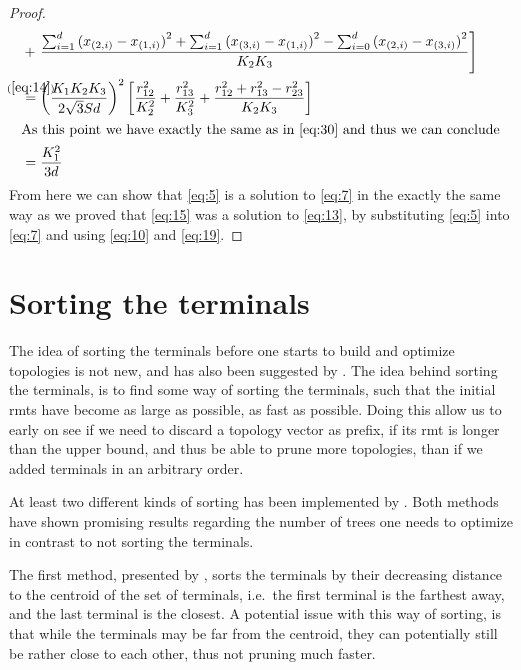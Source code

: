 \begin{proof}
\begin{align}
  &+ \left. \frac{ \sum_{i=1}^d {(x_{(2,i)} - x_{(1,i)})}^2 +
    \sum_{i=1}^d {(x_{(3,i)} - x_{(1,i)})}^2 -
    \sum_{i=0}^d {(x_{(2,i)} - x_{(3,i)})}^2}{K_2 K_3} \right] \\
  &\stackrel{\mathclap{(\ref{eq:14})}}{=}
    {\left( \frac{K_1 K_2 K_3}{2 \sqrt{3} S d} \right)}^2
    \left[ \frac{r_{12}^2}{K_2^2} + \frac{r_{13}^2}{K_3^2} +
    \frac{r_{12}^2 + r_{13}^2 - r_{23}^2}{K_2 K_3} \right] \\
  \intertext{As this point we have exactly the same as in \cref{eq:30} and thus
  we can conclude}
  &= \frac{K_1^2}{3 d}
\end{align}
%
From here we can show that \cref{eq:5} is a solution to \cref{eq:7} in the
exactly the same way as
we proved that \cref{eq:15} was a solution to \cref{eq:13}, by substituting
\cref{eq:5} into \cref{eq:7} and using \cref{eq:10} and \cref{eq:19}.
\end{proof}

\section{Sorting the terminals}
\label{sec:sorting-terminals}

The idea of sorting the terminals before one starts to build and optimize
topologies is not new, and has also been suggested by \textcite{smith1992}. The
idea behind sorting the terminals, is to find some way of sorting the terminals,
such that the initial \acp{rmt} have become as large as possible, as fast as
possible. Doing this allow us to early on see if we need to discard a topology
vector as prefix, if its \ac{rmt} is longer than the upper bound, and thus be
able to prune more topologies, than if we added terminals in an arbitrary order.

At least two different kinds of sorting has been implemented by
\textcite{fonseca2014,vanlaarhoven2013}. Both methods have shown promising
results regarding the number of trees one needs to optimize in contrast to not
sorting the terminals.

The first method, presented by \textcite{vanlaarhoven2013}, sorts the terminals
by their decreasing distance to the centroid of the set of terminals, i.e.\ the
first terminal is the farthest away, and the last terminal is the closest. A
potential issue with this way of sorting, is that while the terminals may be far
from the centroid, they can potentially still be rather close to each other,
thus not pruning much faster.

